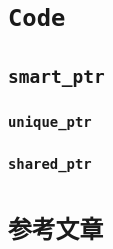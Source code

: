 \newpage
\appendix
\chapter{\tt Code}
\label{appendix_code}
\thispagestyle{fancy}
\section{\tt smart\_ptr}
\label{appendix_code_smart_ptr}
\subsection{\tt unique\_ptr}

\subsection{\tt shared\_ptr}


\chapter{\tt 参考文章}
\thispagestyle{fancy}
